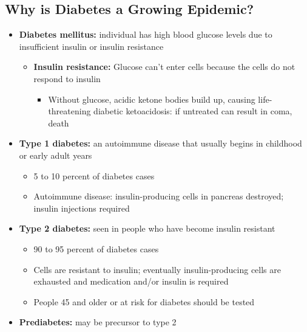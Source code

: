 \documentclass[12pt]{article}
\begin{document}
        \subsection{Why is Diabetes a Growing Epidemic?}
            \begin{itemize}
                \item \textbf{Diabetes mellitus:} individual has high blood glucose levels due to insufficient insulin or insulin resistance
                    \begin{itemize}
                        \item \textbf{Insulin resistance:} Glucose can't enter cells because the cells do not respond to insulin
                            \begin{itemize}
                                \item Without glucose, acidic ketone bodies build up, causing life-threatening diabetic ketoacidosis: if untreated can result in coma, death
                            \end{itemize}
                    \end{itemize}
                \item \textbf{Type 1 diabetes:} an autoimmune disease that usually begins in childhood or early adult years
                    \begin{itemize}
                        \item 5 to 10 percent of diabetes cases
                        \item Autoimmune disease: insulin-producing cells in pancreas destroyed; insulin injections required
                    \end{itemize}
                \item \textbf{Type 2 diabetes:} seen in people who have become insulin resistant
                    \begin{itemize}
                        \item 90 to 95 percent of diabetes cases
                        \item Cells are resistant to insulin; eventually insulin-producing cells are exhausted and medication and/or insulin is required
                        \item People 45 and older or at risk for diabetes should be tested
                    \end{itemize}
                \item \textbf{Prediabetes:} may be precursor to type 2
                    \begin{itemize}

\end{itemize}
\end{itemize}
\end{document}
